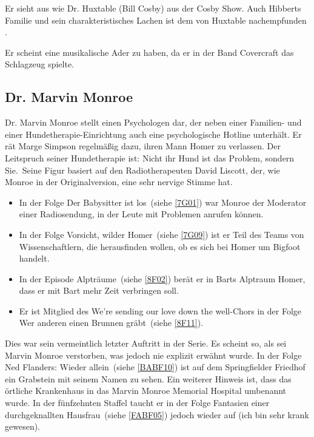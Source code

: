 Er sieht aus wie Dr. Huxtable (Bill Cosby) aus der \glqq Cosby Show\grqq . Auch Hibberts Familie und sein charakteristisches Lachen ist dem von Huxtable nachempfunden \cite{Hibbert}.

Er scheint eine musikalische Ader zu haben, da er in der Band Covercraft das Schlagzeug spielte.


\subsection{Dr. Marvin Monroe}
Dr. Marvin Monroe stellt einen Psychologen dar, der neben einer Familien- und einer Hunde\-the\-ra\-pie-Einrichtung auch eine psychologische Hotline unterhält. Er rät Marge Simpson regelmäßig dazu, ihren Mann Homer zu verlassen. Der Leitspruch seiner Hundetherapie ist: \glqq Nicht ihr Hund ist das Problem, sondern Sie.\grqq\ 
Seine Figur basiert auf den Radiotherapeuten David Liscott, der, wie Monroe in der Originalversion, eine sehr nervige Stimme hat.

\begin{itemize}
	\item In der Folge \glqq Der Babysitter ist los\grqq\ (siehe \ref{7G01}) war Monroe der Moderator einer Radiosendung, in der Leute mit Problemen anrufen können.
	\item In der Folge \glqq Vorsicht, wilder Homer\grqq\ (siehe \ref{7G09}) ist er Teil des Teams von Wissenschaftlern, die herausfinden wollen, ob es sich bei Homer um Bigfoot handelt.
	\item In der Episode \glqq Alpträume\grqq\ (siehe \ref{8F02}) berät er in Barts Alptraum Homer, dass er mit Bart mehr Zeit verbringen soll.
	\item Er ist Mitglied des \glqq We're sending our love down the well\grqq -Chors in der Folge \glqq Wer anderen einen Brunnen gräbt\grqq\ (siehe \ref{8F11}).
\end{itemize}

Dies war sein vermeintlich letzter Auftritt in der Serie. Es scheint so, als sei Marvin Monroe verstorben, was jedoch nie explizit erwähnt wurde. In der Folge \glqq Ned Flanders: Wieder allein\grqq\ (siehe \ref{BABF10}) ist auf dem Springfielder Friedhof ein Grabstein mit seinem Namen zu sehen. Ein weiterer Hinweis ist, dass das örtliche Krankenhaus in das Marvin Monroe Memorial Hospital umbenannt wurde. In der fünfzehnten Staffel taucht er in der Folge \glqq Fantasien einer durchgeknallten Hausfrau\grqq\ (siehe \ref{FABF05}) jedoch wieder auf (\glqq ich bin sehr krank gewesen\grqq ).

